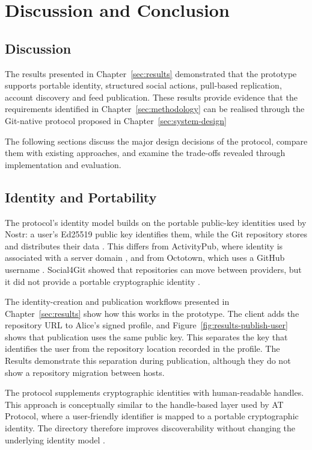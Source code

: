 \section{Discussion and Conclusion} 

\subsection{Discussion}
The results presented in Chapter~\ref{sec:results} demonstrated that the
prototype supports portable identity, structured social actions,
pull-based replication, account discovery and feed publication. These
results provide evidence that the requirements identified in Chapter~\ref{sec:methodology}
can be realised through the Git-native protocol proposed in
Chapter~\ref{sec:system-design}

The following sections discuss the major design decisions of the
protocol, compare them with existing approaches, and examine the
trade-offs revealed through implementation and evaluation.

\subsection{Identity and Portability}

The protocol's identity model builds on the portable public-key identities
used by Nostr: a user's Ed25519 public key identifies them, while the Git
repository stores and distributes their data \cite{fiatjaf2026}. This differs
from ActivityPub, where identity is associated with a server domain
\cite{w3cActivityPub2018}, and from Octotown, which uses a GitHub username
\cite{octotown2026}. Social4Git showed that repositories can move between
providers, but it did not provide a portable cryptographic identity
\cite{social4git2026}.

The identity-creation and publication workflows presented in
Chapter~\ref{sec:results} show how this works in the prototype. The client
adds the repository URL to Alice's signed profile, and
Figure~\ref{fig:results-publish-user} shows that publication uses the same
public key. This separates the key that identifies the user from the
repository location recorded in the profile. The Results demonstrate this
separation during publication, although they do not show a repository
migration between hosts.

The protocol supplements cryptographic identities with human-readable
handles. This approach is conceptually similar to the handle-based layer
used by AT Protocol, where a user-friendly identifier is mapped to a
portable cryptographic identity. The directory therefore improves
discoverability without changing the underlying identity model
\cite{atproto2026}.

